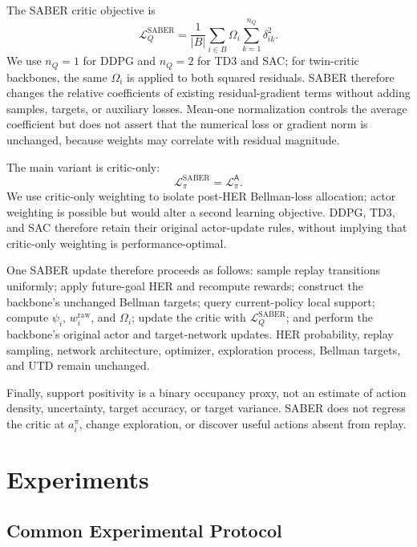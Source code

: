 \documentclass[letterpaper]{article}
\begin{document}
The SABER critic objective is
\begin{equation}
\mathcal L_Q^{\mathrm{SABER}}
=\frac{1}{|B|}
\sum_{i\in B}\Omega_i
\sum_{k=1}^{n_Q}\delta_{ik}^{2}.
\end{equation}
We use \(n_Q=1\) for DDPG and \(n_Q=2\) for TD3 and SAC; for twin-critic
backbones, the same \(\Omega_i\) is applied to both squared residuals.
SABER therefore changes the relative coefficients of existing
residual-gradient terms without adding samples, targets, or auxiliary
losses.  Mean-one normalization controls the average coefficient but
does not assert that the numerical loss or gradient norm is unchanged,
because weights may correlate with residual magnitude.

The main variant is critic-only:
\begin{equation}
\mathcal L_\pi^{\mathrm{SABER}}
=\mathcal L_\pi^{\mathsf A}.
\end{equation}
We use critic-only weighting to isolate post-HER Bellman-loss
allocation; actor weighting is possible but would alter a second
learning objective. DDPG, TD3, and SAC therefore retain their original
actor-update rules, without implying that critic-only weighting is
performance-optimal.

One SABER update therefore proceeds as follows: sample replay
transitions uniformly; apply future-goal HER and recompute rewards;
construct the backbone's unchanged Bellman targets; query
current-policy local support; compute \(\psi_i\), \(w_i^{\mathrm{raw}}\),
and \(\Omega_i\); update the critic with
\(\mathcal L_Q^{\mathrm{SABER}}\); and perform the backbone's original
actor and target-network updates.  HER probability, replay sampling,
network architecture, optimizer, exploration process, Bellman
targets, and UTD remain unchanged.

Finally, support positivity is a binary occupancy proxy, not an
estimate of action density, uncertainty, target accuracy, or target
variance. SABER does not regress the critic at \(a_i^\pi\), change
exploration, or discover useful actions absent from replay.

\section{Experiments}\label{sec:experiments}

\subsection{Common Experimental Protocol}
\end{document}
